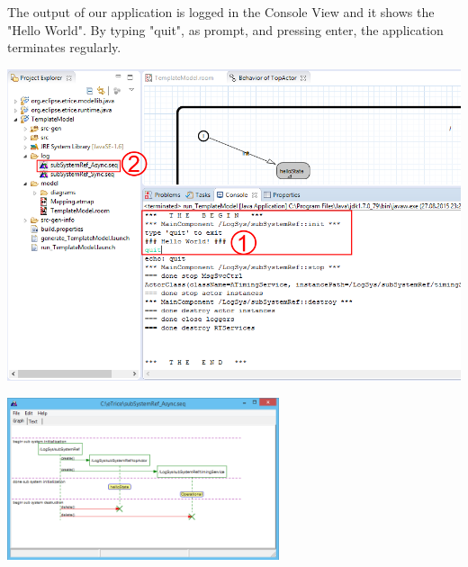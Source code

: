 The output of our application is logged in the Console View and it shows the "Hello World". By typing "quit", as prompt, and pressing enter, the application terminates regularly.

\includegraphics[width=\textwidth]{images/014-quit-hello-msc.png}



\includegraphics[width=0.6\textwidth]{images/014-hello-msc.png}